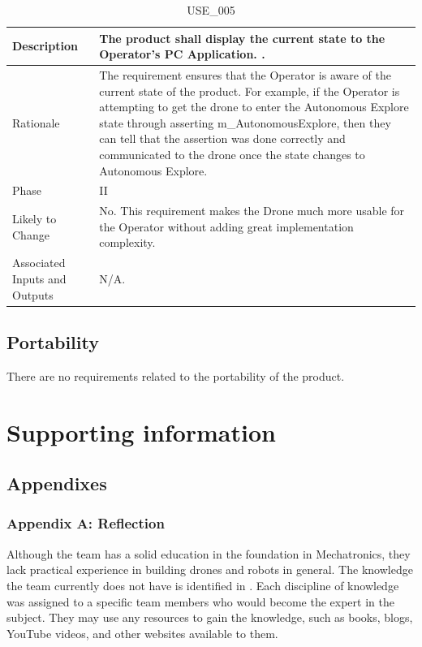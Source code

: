 \documentclass{article}
\begin{document}
\begin{table}[!h]
\begin{center}
\caption {USE\_005} 
\label{USE_005}
\begin{tabular}{ | m{3cm} | m{11cm} | }
\hline
Description & The product shall display the current state to the Operator's PC Application. \nameref{sec:Assumptions}. \\
\hline
Rationale & The requirement ensures that the Operator is aware of the current state of the product. For example, if the Operator is attempting to get the drone to enter the Autonomous Explore state through asserting m_AutonomousExplore, then they can tell that the assertion was done correctly and communicated to the drone once the state changes to Autonomous Explore. \\
\hline
Phase & II \\
\hline
Likely to Change & No. This requirement makes the Drone much more usable for the Operator without adding great implementation complexity. \\
\hline
Associated Inputs and Outputs & N/A.  \\
\hline
\end{tabular}
\end{center}
\end{table}
\clearpage
\newpage

\subsection{ Portability}
There are no requirements related to the portability of the product.

\section{Supporting information}
\subsection{Appendixes}
\label{appendix}
\subsubsection{Appendix A: Reflection}
\label{appendixa}
Although the team has a solid education in the foundation in Mechatronics, they lack practical experience in building drones and robots in general. The knowledge the team currently does not have is identified in . Each discipline of knowledge was assigned to a specific team members who would become the expert in the subject. They may use any resources to gain the knowledge, such as books, blogs, YouTube videos, and other websites available to them. 
\end{document}
